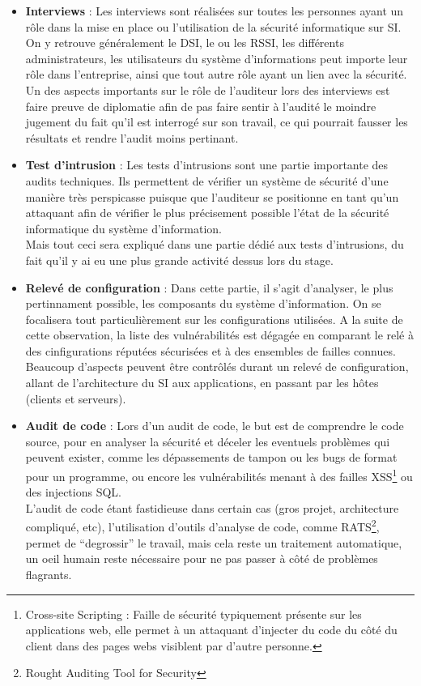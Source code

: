\documentclass[a4paper]{memoir}
\begin{document}
\begin{itemize}

\item \textbf{Interviews} : Les interviews sont réalisées sur toutes les personnes ayant un rôle dans la mise en place ou l'utilisation de la sécurité informatique sur SI.
On y retrouve généralement le DSI, le ou les RSSI, les différents administrateurs, les utilisateurs du système d'informations peut importe leur rôle dans l'entreprise, ainsi que tout autre rôle ayant un lien avec la sécurité.\\
Un des aspects importants sur le rôle de l'auditeur lors des interviews est faire preuve de diplomatie afin de pas faire sentir à l'audité le moindre jugement du fait qu'il est interrogé sur son travail, ce qui pourrait fausser les résultats et rendre l'audit moins pertinant.\\

\item \textbf{Test d'intrusion} : Les tests d'intrusions sont une partie importante des audits techniques. Ils permettent de vérifier un système de sécurité d'une manière très perspicasse puisque que l'auditeur se positionne en tant qu'un attaquant afin de vérifier le plus précisement possible l'état de la sécurité informatique du système d'information.\\
  Mais tout ceci sera expliqué dans une partie dédié aux tests d'intrusions, du fait qu'il y ai eu une plus grande activité dessus lors du stage.\\

\item \textbf{Relevé de configuration} : Dans cette partie, il s'agit d'analyser, le plus pertinnament possible, les composants du système d'information. On se focalisera tout particulièrement sur les configurations utilisées. A la suite de cette observation, la liste des vulnérabilités est dégagée en comparant le relé à des cinfigurations réputées sécurisées et à des ensembles de failles connues. Beaucoup d'aspects peuvent être contrôlés durant un relevé de configuration, allant de l'architecture du SI aux applications, en passant par les hôtes (clients et serveurs).\\

\item \textbf{Audit de code} : Lors d'un audit de code, le but est de comprendre le code source, pour en analyser la sécurité et déceler les eventuels problèmes qui peuvent exister, comme les dépassements de tampon ou les bugs de format pour un programme, ou encore les vulnérabilités menant à des failles XSS\footnote{Cross-site Scripting : Faille de sécurité typiquement présente sur les applications web, elle permet à un attaquant d'injecter du code du côté du client dans des pages webs visiblent par d'autre personne.} ou des injections SQL.\\
  \noindent L'audit de code étant fastidieuse dans certain cas (gros projet, architecture compliqué, etc), l'utilisation d'outils d'analyse de code, comme RATS\footnote{Rought Auditing Tool for Security}, permet de ``degrossir'' le travail, mais cela reste un traitement automatique, un oeil humain reste nécessaire pour ne pas passer à côté de problèmes flagrants.\\


\end{itemize}
\end{document}
